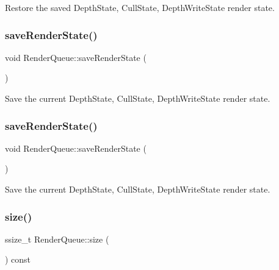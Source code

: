 Restore the saved Depth\+State, Cull\+State, Depth\+Write\+State render state. \mbox{\label{classRenderQueue_a69e89af620d29b96de300710c39ea293}} 
\subsubsection{\texorpdfstring{save\+Render\+State()}{saveRenderState()}\hspace{0.1cm}{\footnotesize\ttfamily [1/2]}}
{\footnotesize\ttfamily void Render\+Queue\+::save\+Render\+State (\begin{DoxyParamCaption}{ }\end{DoxyParamCaption})}

Save the current Depth\+State, Cull\+State, Depth\+Write\+State render state. \mbox{\label{classRenderQueue_a69e89af620d29b96de300710c39ea293}} 
\subsubsection{\texorpdfstring{save\+Render\+State()}{saveRenderState()}\hspace{0.1cm}{\footnotesize\ttfamily [2/2]}}
{\footnotesize\ttfamily void Render\+Queue\+::save\+Render\+State (\begin{DoxyParamCaption}{ }\end{DoxyParamCaption})}

Save the current Depth\+State, Cull\+State, Depth\+Write\+State render state. \mbox{\label{classRenderQueue_aadadee1f1d53d85fa2d91cad921652e4}} 
\subsubsection{\texorpdfstring{size()}{size()}\hspace{0.1cm}{\footnotesize\ttfamily [1/2]}}
{\footnotesize\ttfamily ssize\+\_\+t Render\+Queue\+::size (\begin{DoxyParamCaption}{ }\end{DoxyParamCaption}) const}

